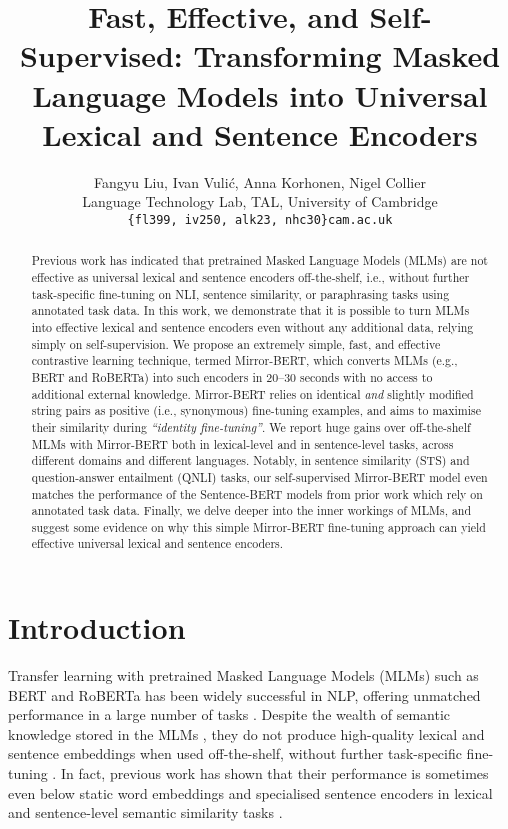 \documentclass[11pt]{article}
\title{Fast, Effective, and Self-Supervised: Transforming Masked Language Models into Universal Lexical and Sentence Encoders}
\author{Fangyu Liu, Ivan Vuli\'{c}, Anna Korhonen, Nigel Collier \\
Language Technology Lab, TAL, University of Cambridge\\
\texttt{\{fl399, iv250, alk23, nhc30\}cam.ac.uk} }
\begin{document}
\maketitle
\begin{abstract}
Previous work has indicated that pretrained Masked Language Models (MLMs) are not effective as universal lexical and sentence encoders off-the-shelf, i.e., without further task-specific fine-tuning on NLI, sentence similarity, or paraphrasing tasks using annotated task data. In this work, we demonstrate that it is possible to turn MLMs into effective lexical and sentence encoders even without any additional data, relying simply on self-supervision. We propose an extremely simple, fast, and effective contrastive learning technique, termed Mirror-BERT, which converts MLMs (e.g., BERT and RoBERTa) into such encoders in 20--30 seconds with no access to additional external knowledge. Mirror-BERT relies on identical \textit{and} slightly modified string pairs as positive (i.e., synonymous) fine-tuning examples, and aims to maximise their similarity during \textit{``identity fine-tuning''}. We report huge gains over off-the-shelf MLMs with Mirror-BERT both in lexical-level and in sentence-level tasks, across different domains and different languages. Notably, in sentence similarity (STS) and question-answer entailment (QNLI) tasks, our self-supervised Mirror-BERT model even matches the performance of the Sentence-BERT models from prior work which rely on annotated task data. Finally, we delve deeper into the inner workings of MLMs, and suggest some evidence on why this simple Mirror-BERT fine-tuning approach can yield effective universal lexical and sentence encoders.
\end{abstract}

\section{Introduction}
Transfer learning with pretrained Masked Language Models (MLMs) such as BERT \citep{devlin2019bert} and RoBERTa \citep{liu2019roberta} has been widely successful in NLP, offering unmatched performance in a large number of tasks \cite{Wang:2019nips}. Despite the wealth of semantic knowledge stored in the MLMs \cite{Rogers:2020tacl}, they do not produce high-quality lexical and sentence embeddings when used off-the-shelf, without further task-specific fine-tuning \citep{feng2020language,li-etal-2020-sentence}. In fact, previous work has shown that their performance is sometimes even below static word embeddings and specialised sentence encoders \cite{Cer:2018arxiv} in lexical and sentence-level semantic similarity tasks \citep{reimers2019sentence,vulic-etal-2020-probing,Litschko:2021ecir}.
\end{document}
